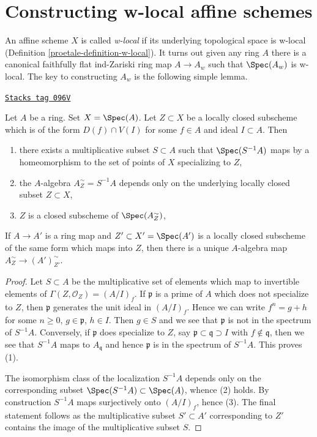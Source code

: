 \section{Constructing w-local affine schemes}
\label{proetale-section-construction}
An affine scheme $X$ is called {\it w-local} if its underlying
topological space is w-local (Definition \ref{proetale-definition-w-local}).
It turns out given any ring $A$ there is a canonical faithfully
flat ind-Zariski ring map $A \to A_w$ such that $\Spec(A_w)$ is
w-local. The key to constructing $A_w$ is the following simple lemma.

\begin{lemma}[Localization]
\label{proetale-lemma-localization}
\href{https://stacks.math.columbia.edu/tag/096V}{\texttt{Stacks tag 096V}}

Let $A$ be a ring. Set $X = \Spec(A)$. Let $Z \subset X$ be a locally closed
subscheme which is of the form $D(f) \cap V(I)$ for some $f \in A$ and
ideal $I \subset A$. Then
\begin{enumerate}
\item there exists a multiplicative subset $S \subset A$ such that
$\Spec(S^{-1}A)$ maps by a homeomorphism to the set of points of $X$
specializing to $Z$,
\item the $A$-algebra $A_Z^\sim = S^{-1}A$ depends only on
the underlying locally closed subset $Z \subset X$,
\item $Z$ is a closed subscheme of $\Spec(A_Z^\sim)$,
\end{enumerate}
If $A \to A'$ is a ring map and $Z' \subset X' = \Spec(A')$ is a
locally closed subscheme of the same form which maps into $Z$,
then there is a unique $A$-algebra map
$A_Z^\sim \to (A')_{Z'}^\sim$.
\end{lemma}

\begin{proof}
Let $S \subset A$ be the multiplicative set of elements which map
to invertible elements of $\Gamma(Z, \mathcal{O}_Z) = (A/I)_f$.
If $\mathfrak p$ is a prime of $A$ which does not specialize to $Z$,
then $\mathfrak p$ generates the unit ideal in $(A/I)_f$. Hence
we can write $f^n =  g + h$ for some $n \geq 0$, $g \in \mathfrak p$,
$h \in I$. Then $g \in S$ and we see that $\mathfrak p$ is not in
the spectrum of $S^{-1}A$. Conversely, if $\mathfrak p$ does specialize
to $Z$, say $\mathfrak p \subset \mathfrak q \supset I$ with
$f \not \in \mathfrak q$, then we see that $S^{-1}A$ maps to
$A_\mathfrak q$ and hence $\mathfrak p$ is in the spectrum of $S^{-1}A$.
This proves (1).

\medskip\noindent
The isomorphism class of the localization $S^{-1}A$ depends only
on the corresponding subset $\Spec(S^{-1}A) \subset \Spec(A)$, whence
(2) holds. By construction $S^{-1}A$ maps surjectively onto
$(A/I)_f$, hence (3). The final statement follows as the multiplicative subset
$S' \subset A'$ corresponding to $Z'$ contains the image of the
multiplicative subset $S$.
\end{proof}

